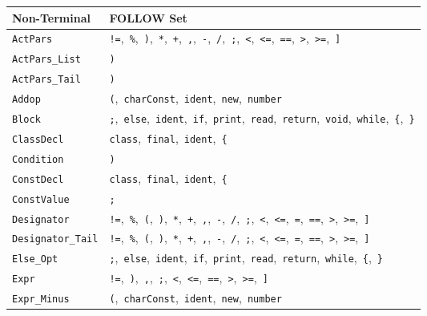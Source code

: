 \documentclass[11pt,a4paper]{article}
\newcommand{\theadcell}[1]{\textbf{\color{white}#1}}
\begin{document}
\begin{center}
\begin{tabular}{|L{3.8cm}|L{10.6cm}|}
\hline
{}
\theadcell{Non-Terminal} & \theadcell{FOLLOW Set} \\
\hline
\texttt{ActPars} & \texttt{!=},\ \texttt{\%},\ \texttt{)},\ \texttt{*},\ \texttt{+},\ \texttt{,},\ \texttt{-},\ \texttt{/},\ \texttt{;},\ \texttt{<},\ \texttt{<=},\ \texttt{==},\ \texttt{>},\ \texttt{>=},\ \texttt{]} \\
\texttt{ActPars\_List} & \texttt{)} \\
\texttt{ActPars\_Tail} & \texttt{)} \\
\texttt{Addop} & \texttt{(},\ \texttt{charConst},\ \texttt{ident},\ \texttt{new},\ \texttt{number} \\
\texttt{Block} & \texttt{;},\ \texttt{else},\ \texttt{ident},\ \texttt{if},\ \texttt{print},\ \texttt{read},\ \texttt{return},\ \texttt{void},\ \texttt{while},\ \texttt{\{},\ \texttt{\}} \\
\texttt{ClassDecl} & \texttt{class},\ \texttt{final},\ \texttt{ident},\ \texttt{\{} \\
\texttt{Condition} & \texttt{)} \\
\texttt{ConstDecl} & \texttt{class},\ \texttt{final},\ \texttt{ident},\ \texttt{\{} \\
\texttt{ConstValue} & \texttt{;} \\
\texttt{Designator} & \texttt{!=},\ \texttt{\%},\ \texttt{(},\ \texttt{)},\ \texttt{*},\ \texttt{+},\ \texttt{,},\ \texttt{-},\ \texttt{/},\ \texttt{;},\ \texttt{<},\ \texttt{<=},\ \texttt{=},\ \texttt{==},\ \texttt{>},\ \texttt{>=},\ \texttt{]} \\
\texttt{Designator\_Tail} & \texttt{!=},\ \texttt{\%},\ \texttt{(},\ \texttt{)},\ \texttt{*},\ \texttt{+},\ \texttt{,},\ \texttt{-},\ \texttt{/},\ \texttt{;},\ \texttt{<},\ \texttt{<=},\ \texttt{=},\ \texttt{==},\ \texttt{>},\ \texttt{>=},\ \texttt{]} \\
\texttt{Else\_Opt} & \texttt{;},\ \texttt{else},\ \texttt{ident},\ \texttt{if},\ \texttt{print},\ \texttt{read},\ \texttt{return},\ \texttt{while},\ \texttt{\{},\ \texttt{\}} \\
\texttt{Expr} & \texttt{!=},\ \texttt{)},\ \texttt{,},\ \texttt{;},\ \texttt{<},\ \texttt{<=},\ \texttt{==},\ \texttt{>},\ \texttt{>=},\ \texttt{]} \\
\texttt{Expr\_Minus} & \texttt{(},\ \texttt{charConst},\ \texttt{ident},\ \texttt{new},\ \texttt{number} \\

\end{tabular}
\end{center}
\end{document}
